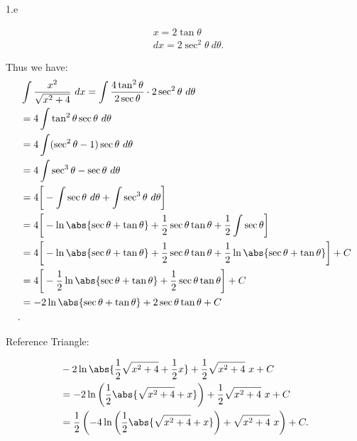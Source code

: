 \documentclass{report}
\begin{document}
    \bigbreak \noindent 
    1.e
    \bigbreak \noindent 
    \begin{minipage}[t]{0.47\textwidth}
        \begin{align*}
            &x=2\tan{\theta } \\
            &dx = 2\sec^{2}{\theta }\ d\theta 
        .\end{align*} 
    \end{minipage}
    \begin{minipage}[t]{0.47\textwidth}
        Thus we have:
        \begin{align*}
            &\int \frac{x^{2}}{\sqrt{x^{2}+4}}\ dx = \int \frac{4\tan^{2}{\theta }}{2\sec{\theta }} \cdot 2\sec^{2}{\theta }\ d\theta  \\
            &=4\int \tan^{2}{\theta }\sec{\theta }\ d\theta  \\
            &=4\int (\sec^{2}{\theta }-1)\sec{\theta }\ d\theta  \\
            &=4\int \sec^{3}{\theta }-\sec{\theta }\ d\theta  \\
            &=4\bigg[-\int \sec{\theta }\ d\theta  + \int \sec^{3}{\theta }\ d\theta \bigg] \\
            &=4\bigg[-\ln{\abs{\sec{\theta } + \tan{\theta }}} + \frac{1}{2}\sec{\theta }\tan{\theta }+\frac{1}{2}\int \sec{\theta }\bigg] \\
            &=4\bigg[-\ln{\abs{\sec{\theta } + \tan{\theta }}} + \frac{1}{2}\sec{\theta }\tan{\theta }+\frac{1}{2}\ln{\abs{\sec{\theta } + \tan{\theta }}}\bigg] + C \\
            &=4\bigg[-\frac{1}{2}\ln{\abs{\sec{\theta } + \tan{\theta }}} + \frac{1}{2}\sec{\theta }\tan{\theta }\bigg] + C \\
            &=-2\ln{\abs{\sec{\theta} + \tan{\theta}}} + 2\sec{\theta}\tan{\theta} + C \\
        .\end{align*}
    \end{minipage}
    \bigbreak \noindent 
    \begin{minipage}[]{0.47\textwidth}
        Reference Triangle:
        \bigbreak \noindent 
    \end{minipage}
    \begin{minipage}[]{0.47\textwidth}
        \begin{align*}
            &-2\ln{\abs{\frac{1}{2}\sqrt{x^{2}+4} +\frac{1}{2}x}} + \frac{1}{2}\sqrt{x^{2}+4}\ x + C \\
            &=-2\ln{\left(\frac{1}{2}\abs{\sqrt{x^{2}+4} + x}\right)} + \frac{1}{2}\sqrt{x^{2}+4}\ x + C \\
            &=\frac{1}{2}\left(-4\ln{\left(\frac{1}{2}\abs{\sqrt{x^{2}+4}+x}\right)}+\sqrt{x^{2}+4}\ x\right) + C
        .\end{align*}
    
    \end{minipage}
\end{document}
